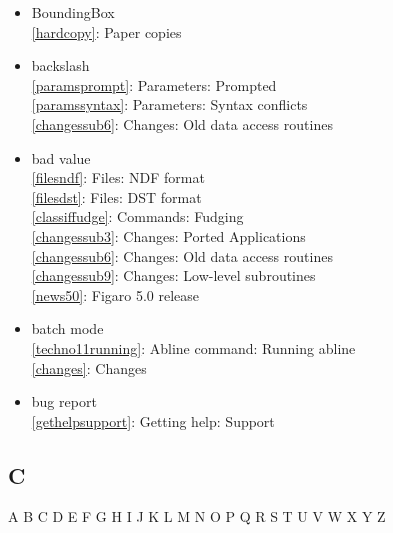\documentclass[11pt,twoside]{article}
\newcommand{\htmlref}[2]{#1}
\newcommand{\idxint}[2]{\ref{#1}: \htmlref{#2}{#1}}
\newcommand{\idxint}[2]{\htmlref{#2}{#1}}
\begin{document}
\begin{itemize}
\item BoundingBox\\
   \idxint{hardcopy}{Paper copies}
\item backslash\\
   \idxint{paramsprompt}{Parameters: Prompted}\\
   \idxint{paramssyntax}{Parameters: Syntax conflicts}\\
   \idxint{changessub6}{Changes: Old data access routines}
\item bad value\\
   \idxint{filesndf}{Files: NDF format}\\
   \idxint{filesdst}{Files: DST format}\\
   \idxint{classiffudge}{Commands: Fudging}\\
   \idxint{changessub3}{Changes: Ported Applications}\\
   \idxint{changessub6}{Changes: Old data access routines}\\
   \idxint{changessub9}{Changes: Low-level subroutines}\\
   \idxint{news50}{Figaro 5.0 release}
\item batch mode\\
   \idxint{techno11running}{Abline command: Running abline}\\
   \idxint{changes}{Changes}
\item bug report\\
   \idxint{gethelpsupport}{Getting help: Support}
\end{itemize}

\subsection*{\label{index_C}C}

\begin{htmlonly}
\htmlref{A}{index_A}
\htmlref{B}{index_B}
C
\htmlref{D}{index_D}
\htmlref{E}{index_E}
\htmlref{F}{index_F}
\htmlref{G}{index_G}
\htmlref{H}{index_H}
\htmlref{I}{index_I}
\htmlref{J}{index_J}
\htmlref{K}{index_K}
\htmlref{L}{index_L}
\htmlref{M}{index_M}
\htmlref{N}{index_N}
\htmlref{O}{index_O}
\htmlref{P}{index_P}
\htmlref{Q}{index_Q}
\htmlref{R}{index_R}
\htmlref{S}{index_S}
\htmlref{T}{index_T}
\htmlref{U}{index_U}
\htmlref{V}{index_V}
\htmlref{W}{index_W}
\htmlref{X}{index_X}
\htmlref{Y}{index_Y}
Z
\end{htmlonly}
\end{document}
